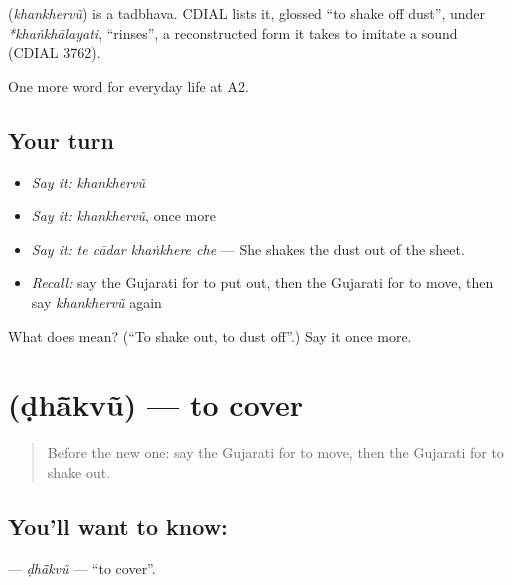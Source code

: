\begin{cousinweb}
\textbf{} (\emph{khankhervũ}) is a tadbhava. CDIAL lists it, glossed \textquotedblleft{}to shake off dust\textquotedblright{}, under \emph{*khaṅkhālayati}, \textquotedblleft{}rinses\textquotedblright{}, a reconstructed form it takes to imitate a sound (CDIAL 3762).
\end{cousinweb}

\begin{grammarlens}[title={What you've built}]
One more word for everyday life at A2.
\end{grammarlens}

\subsection*{Your turn}
\begin{itemize}
\raggedright
  \item \emph{Say it:} \emph{khankhervũ}
  \item \emph{Say it:} \emph{khankhervũ}, once more
  \item \emph{Say it:} \emph{te cādar khaṅkhere che} — She shakes the dust out of the sheet.
  \item \emph{Recall:} say the Gujarati for to put out, then the Gujarati for to move, then say \emph{khankhervũ} again
\end{itemize}

\begin{tcolorbox}[breakable,colback=teal!4,colframe=teal!35!black,title={Before you move on}]
What does  mean? (\textquotedblleft{}To shake out, to dust off\textquotedblright{}.) Say it once more.
\end{tcolorbox}
\section[\texorpdfstring{\gu{ઢાંકવું} (ḍhā̃kvũ)}{ઢાંકવું (ḍhā̃kvũ)}]{ (ḍhā̃kvũ) — to cover}

\label{lesson:GU-C161-dhakvu}



\begin{quote}
Before the new one: say the Gujarati for to move, then the Gujarati for to shake out.
\end{quote}

\subsection*{You'll want to know: }
\textbf{} — \emph{ḍhā̃kvũ} — \textquotedblleft{}to cover\textquotedblright{}.

